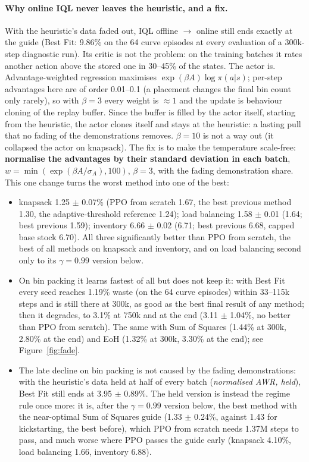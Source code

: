 \documentclass[11pt,a4paper]{article}
\begin{document}
\paragraph{Why online IQL never leaves the heuristic, and a fix.} With the heuristic's data faded out, IQL offline
$\to$ online still ends exactly at the guide (Best Fit: 9.86\% on the 64 curve episodes at every evaluation of a
300k-step diagnostic run). Its critic is not the problem: on the training batches it rates another action above the
stored one in 30--45\% of the states. The actor is. Advantage-weighted regression maximises
$\exp(\beta A)\log\pi(a|s)$; per-step advantages here are of order 0.01--0.1 (a placement changes the final bin
count only rarely), so with $\beta = 3$ every weight is $\approx 1$ and the update is behaviour cloning of the replay
buffer. Since the buffer is filled by the actor itself, starting from the heuristic, the actor clones itself and
stays at the heuristic: a lasting pull that no fading of the demonstrations removes. $\beta = 10$ is not a way out (it
collapsed the actor on knapsack). The fix is to make the temperature scale-free: \textbf{normalise the advantages by
their standard deviation in each batch}, $w = \min(\exp(\beta A/\sigma_A), 100)$, $\beta = 3$, with the fading
demonstration share. This one change turns the worst method into one of the best:
\begin{itemize}[leftmargin=*]
\item knapsack 1.25 $\pm$ 0.07\% (PPO from scratch 1.67, the best previous method 1.30, the adaptive-threshold
  reference 1.24); load balancing 1.58 $\pm$ 0.01 (1.64; best previous 1.59); inventory 6.66 $\pm$ 0.02 (6.71; best
  previous 6.68, capped base stock 6.70). All three significantly better than PPO from scratch, the best of all methods
  on knapsack and inventory, and on load balancing second only to its $\gamma = 0.99$ version below.
\item On bin packing it learns fastest of all but does not keep it: with Best Fit every seed reaches 1.19\%
  waste (on the 64 curve episodes) within 33--115k steps and is still there at 300k, as good as the best final result of
  any method; then it degrades, to 3.1\% at 750k and at the end (3.11 $\pm$ 1.04\%, no better than PPO from scratch).
  The same with Sum of Squares (1.44\% at 300k, 2.80\% at the end) and EoH (1.32\% at 300k, 3.30\% at the end);
  see Figure~\ref{fig:fade}.
\end{itemize}
\begin{itemize}[leftmargin=*,resume]
\item The late decline on bin packing is not caused by the fading demonstrations: with the heuristic's data held at
  half of every batch (\emph{normalised AWR, held}), Best Fit still ends at 3.95 $\pm$ 0.89\%. The held version is
  instead the regime rule once more: it is, after the $\gamma = 0.99$ version below, the best method with the near-optimal Sum of Squares guide
  (1.33 $\pm$ 0.24\%, against 1.43 for kickstarting, the best before), which PPO from scratch needs 1.37M steps to
  pass, and much worse where PPO passes the guide early (knapsack 4.10\%, load balancing 1.66, inventory 6.88).
\end{itemize}
\end{document}
